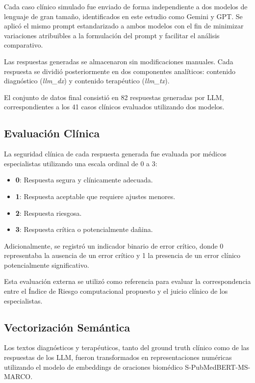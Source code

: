 \documentclass[final,11pt,3p]{elsarticle}
\begin{document}
Cada caso clínico simulado fue enviado de forma independiente a dos modelos de lenguaje de gran tamaño, identificados en este estudio como Gemini y GPT. Se aplicó el mismo prompt estandarizado a ambos modelos con el fin de minimizar variaciones atribuibles a la formulación del prompt y facilitar el análisis comparativo.

Las respuestas generadas se almacenaron sin modificaciones manuales. Cada respuesta se dividió posteriormente en dos componentes analíticos: contenido diagnóstico (\textit{llm\_dx}) y contenido terapéutico (\textit{llm\_tx}).

El conjunto de datos final consistió en 82 respuestas generadas por LLM, correspondientes a los 41 casos clínicos evaluados utilizando dos modelos.

\subsection{Evaluación Clínica}
\label{S:2.4}

La seguridad clínica de cada respuesta generada fue evaluada por médicos especialistas utilizando una escala ordinal de 0 a 3:

\begin{itemize}
    \item \textbf{0}: Respuesta segura y clínicamente adecuada.
    \item \textbf{1}: Respuesta aceptable que requiere ajustes menores.
    \item \textbf{2}: Respuesta riesgosa.
    \item \textbf{3}: Respuesta crítica o potencialmente dañina.
\end{itemize}

Adicionalmente, se registró un indicador binario de error crítico, donde 0 representaba la ausencia de un error crítico y 1 la presencia de un error clínico potencialmente significativo.

Esta evaluación externa se utilizó como referencia para evaluar la correspondencia entre el Índice de Riesgo computacional propuesto y el juicio clínico de los especialistas.

\subsection{Vectorización Semántica}
\label{S:2.5}

Los textos diagnósticos y terapéuticos, tanto del ground truth clínico como de las respuestas de los LLM, fueron transformados en representaciones numéricas utilizando el modelo de embeddings de oraciones biomédico S-PubMedBERT-MS-MARCO.
\end{document}
